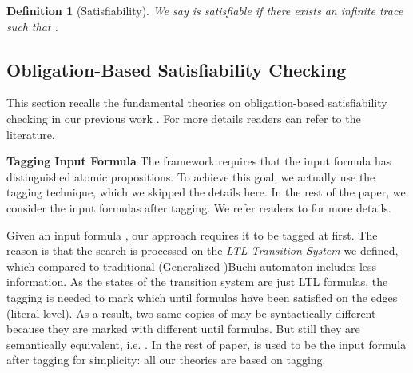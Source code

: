 \documentclass[conference]{IEEEtran}
\newtheorem{definition}{Definition}
\begin{document}
\begin{definition}[Satisfiability]
We say  is satisfiable if there
exists an infinite trace  such that .
\end{definition}




\iffalse
\textbf{Notation.} We define some notation that we use throughout this 
paper.
\begin{itemize}
\item For a formula , we use  to denote the set of
  subformulas of . We denote by  the set of atoms
  appearing in , by  the set of literals over ,
  and by  the set of consistent literal sets over .
\item Let  such that the root
operator of  is not a conjunctive.  We define the set of
conjuncts of  as .
When  does not include a conjunctive as a root operator,
 includes only  itself. The set of
disjuncts  is defined in an analogous way.
\iffalse
\item 
For a formula  of the form  or ,
let  () be left (right) 
subformulas of .
\fi
\item For all propositional formula
 appearing in the paper, we always check first whether
 is satisfiable. If not, we shall replace  by .
\end{itemize}
\fi


\subsection{Obligation-Based Satisfiability Checking}

This section recalls the fundamental theories on obligation-based satisfiability 
checking in our previous work \cite{LZPVH13}. For more details readers can refer to the literature.

\iffalse
\noindent
\textbf{Tagging Input Formula}
The framework requires that the input formula  has distinguished atomic propositions. 
To achieve this goal, we actually use the tagging technique, which we skipped the  
details here. In the rest of the paper, we consider the input formulas after tagging. We refer 
readers to \cite{LZPVH13} for more details. 


Given an input formula , our approach requires it to be tagged at first. 
The reason is that the search is processed on the \textit{LTL Transition System} we defined, 
which compared to traditional (Generalized-)B\"uchi automaton includes less information. 
As the states of the transition system are just LTL formulas, the tagging is needed to mark 
which until formulas have been satisfied on the edges (literal level). As a result, two same 
copies  of  may be syntactically different because they are marked with different until 
formulas. But still they are semantically equivalent, i.e. . 
In the rest of paper,  is used to be the input formula after tagging for simplicity: all our theories are based on tagging. 
\end{document}

